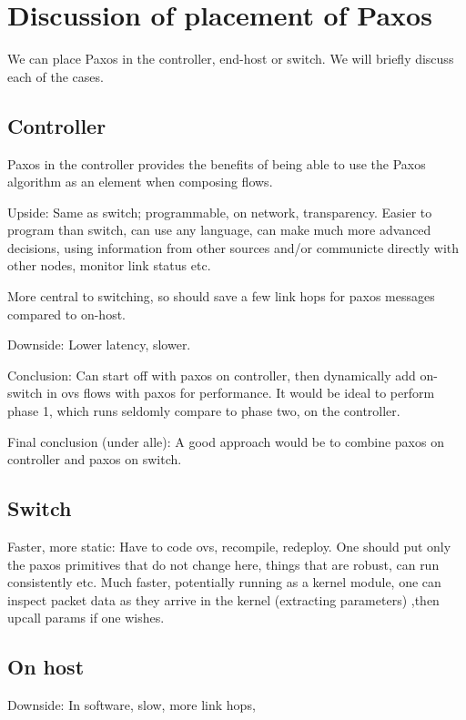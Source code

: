 \section{Discussion of placement of Paxos}

We can place Paxos in the controller, end-host or switch. We will briefly
discuss each of the cases.

\subsection{Controller}

Paxos in the controller provides the benefits of being able to use the Paxos
algorithm as an element when composing flows.

Upside: Same as switch; programmable, on network, transparency.
Easier to program than switch, can use any language, can make much more
advanced decisions, using information from other sources and/or communicte
directly with other nodes, monitor link status etc.

More central to switching, so should save a few link hops for paxos messages
compared to on-host.

Downside: Lower latency, slower.

Conclusion: Can start off with paxos on controller, then dynamically add
on-switch in ovs flows with paxos for performance. It would be ideal to
perform phase 1, which runs seldomly compare to phase two, on the
controller.

Final conclusion (under alle): A good approach would be to combine paxos on
controller and paxos on switch.

\subsection{Switch}

Faster, more static: Have to code ovs, recompile, redeploy. One should put
only the paxos primitives that do not change here, things that are robust,
can run consistently etc. Much faster, potentially running as a kernel
module, one can inspect packet data as they arrive in the kernel
(extracting parameters) ,then upcall params if one wishes.


\subsection{On host}

Downside: In software, slow, more link hops, 

